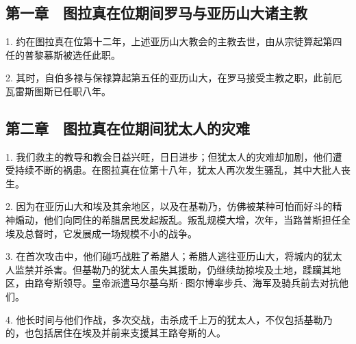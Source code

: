 

\section{}


\subsection{第一章　图拉真在位期间罗马与亚历山大诸主教}

1. 约在图拉真在位第十二年，上述亚历山大教会的主教去世，由从宗徒算起第四任的普黎慕斯被选任此职。\par

2. 其时，自伯多禄与保禄算起第五任的亚历山大，在罗马接受主教之职，此前厄瓦雷斯图斯已任职八年。\par


\subsection{第二章　图拉真在位期间犹太人的灾难}

1. 我们救主的教导和教会日益兴旺，日日进步；但犹太人的灾难却加剧，他们遭受持续不断的祸患。在图拉真在位第十八年，犹太人再次发生骚乱，其中大批人丧生。\par

2. 因为在亚历山大和埃及其余地区，以及在基勒乃，仿佛被某种可怕而好斗的精神煽动，他们向同住的希腊居民发起叛乱。叛乱规模大增，次年，当路普斯担任全埃及总督时，它发展成一场规模不小的战争。\par

3. 在首次攻击中，他们碰巧战胜了希腊人；希腊人逃往亚历山大，将城内的犹太人监禁并杀害。但基勒乃的犹太人虽失其援助，仍继续劫掠埃及土地，蹂躏其地区，由路夸斯领导。皇帝派遣马尔基乌斯·图尔博率步兵、海军及骑兵前去对抗他们。\par

4. 他长时间与他们作战，多次交战，击杀成千上万的犹太人，不仅包括基勒乃的，也包括居住在埃及并前来支援其王路夸斯的人。\par

